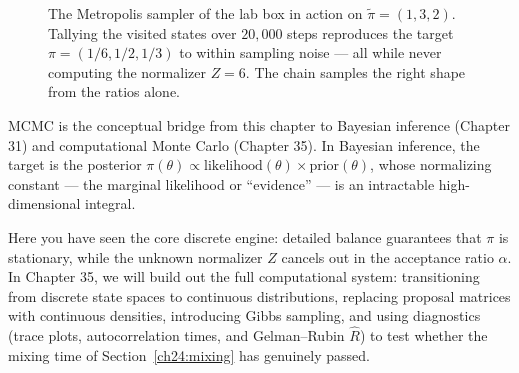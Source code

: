 \begin{figure}[H]
  \centering
  \caption{The Metropolis sampler of the lab box in action on
  $\tilde\pi=(1,3,2)$. Tallying the visited states over $20{,}000$ steps
  reproduces the target $\pi=(1/6,1/2,1/3)$ to within sampling noise --- all
  while never computing the normalizer $Z=6$. The chain samples the right shape
  from the ratios alone.}
  \label{ch24:fig-mcmc-hist}
\end{figure}

\begin{connectionbox}
MCMC is the conceptual bridge from this chapter to Bayesian inference (Chapter 31)
and computational Monte Carlo (Chapter 35). In Bayesian inference, the target is the
posterior $\pi(\theta) \propto \text{likelihood}(\theta)\times \text{prior}(\theta)$,
whose normalizing constant --- the marginal likelihood or ``evidence'' --- is an
intractable high-dimensional integral.

Here you have seen the core discrete engine: detailed balance guarantees that $\pi$
is stationary, while the unknown normalizer $Z$ cancels out in the acceptance ratio
$\alpha$. In Chapter 35, we will build out the full computational system: transitioning
from discrete state spaces to continuous distributions, replacing proposal matrices
with continuous densities, introducing Gibbs sampling, and using diagnostics
(trace plots, autocorrelation times, and Gelman--Rubin $\hat{R}$) to test whether
the mixing time of Section~\ref{ch24:mixing} has genuinely passed.
\end{connectionbox}

